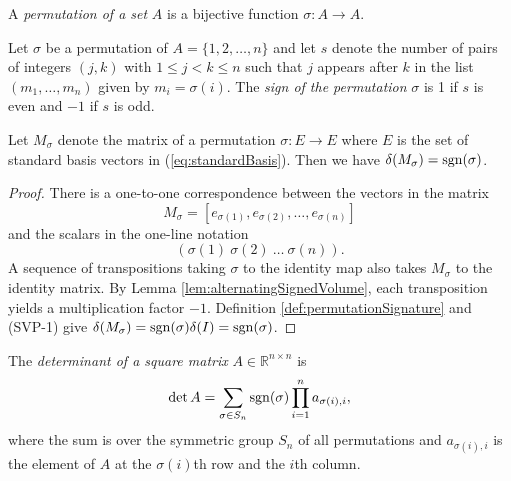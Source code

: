\begin{defn}
  A \emph{permutation of a set} $A$
  is a bijective function $\sigma: A \rightarrow A$.
\end{defn}

\begin{defn}
  \label{def:permutationSignature}
  Let $\sigma$ be a permutation of $A=\{1,2,\ldots, n\}$
  and 
  let $s$ denote the number of pairs of integers $(j,k)$ 
  with $1\le j < k \le n$ such that
  $j$ appears after $k$ in the list $(m_1, \ldots, m_n)$
  given by $m_i=\sigma(i)$.
  The \emph{sign of the permutation} $\sigma$
  is 1 if $s$ is even and $-1$ if $s$ is odd.
\end{defn}

\begin{lem}
  \label{lem:matrixPermIsSgnSigma}
  Let $M_{\sigma}$ denote the matrix of a permutation
  $\sigma: E \rightarrow E$ where $E$ is the set of standard basis
  vectors in (\ref{eq:standardBasis}). 
  Then we have $\delta(M_{\sigma}) = \mathrm{sgn}(\sigma)$.
\end{lem}
\begin{proof}
  There is a one-to-one correspondence
  between the vectors in the matrix
  \begin{displaymath}
    M_{\sigma} = [e_{\sigma(1)}, e_{\sigma(2)}, \ldots, e_{\sigma(n)}]
  \end{displaymath}
  and the scalars in the one-line notation
  \begin{displaymath}
    (\sigma(1)\  \sigma(2)\ \ldots\ \sigma(n)).
  \end{displaymath}
  A sequence of transpositions taking $\sigma$
   to the identity map also
   takes $M_{\sigma}$ to the identity matrix.
  By Lemma \ref{lem:alternatingSignedVolume},
  each transposition yields a multiplication factor $-1$.
  Definition \ref{def:permutationSignature}
  and (SVP-1) give
  $\delta(M_{\sigma})=\mathrm{sgn}(\sigma)\delta(I)=\mathrm{sgn}(\sigma)$.
\end{proof}

\begin{defn}
  \label{def:determinantOfLeibniz}
  The \emph{determinant of a square matrix}
  $A\in \mathbb{R}^{n\times n}$
  is 
  \begin{equation}
    \label{eq:determinantOfLeibniz}
    \det A = \sum_{\sigma\in S_n} \mathrm{sgn}(\sigma) \prod_{i=1}^n
    a_{\sigma(i),i},
  \end{equation}
  where the sum is over 
  the symmetric group $S_n$ of all permutations
  and $a_{\sigma(i),i}$ is the element of $A$
  at the $\sigma(i)$th row and the $i$th column.
\end{defn}


